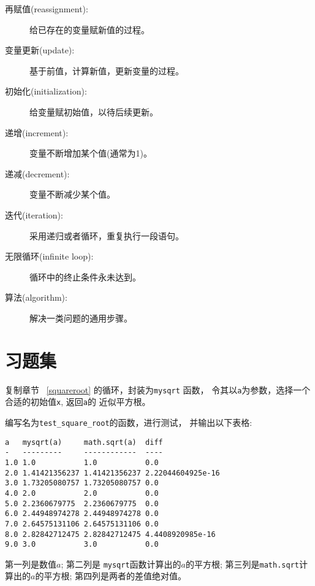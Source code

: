 \documentclass[10pt]{book}
\begin{document}
\begin{description}

\item[再赋值(reassignment):] 给已存在的变量赋新值的过程。

\item[变量更新(update):] 基于前值，计算新值，更新变量的过程。

\item[初始化(initialization):] 给变量赋初始值，以待后续更新。

\item[递增(increment):] 变量不断增加某个值(通常为1)。

\item[递减(decrement):] 变量不断减少某个值。

\item[迭代(iteration):] 采用递归或者循环，重复执行一段语句。

\item[无限循环(infinite loop):] 循环中的终止条件永未达到。

\item[算法(algorithm):]  解决一类问题的通用步骤。

\end{description}


\section{习题集}

\begin{exercise}

复制章节 ~\ref{squareroot} 的循环，封装为\verb"mysqrt" 函数，
令其以{\tt a}为参数，选择一个合适的初始值{\tt x}, 返回{\tt a}的
近似平方根。 

编写名为\verb"test_square_root"的函数，进行测试，
并输出以下表格:

\begin{verbatim}
a   mysqrt(a)     math.sqrt(a)  diff
-   ---------     ------------  ----
1.0 1.0           1.0           0.0
2.0 1.41421356237 1.41421356237 2.22044604925e-16
3.0 1.73205080757 1.73205080757 0.0
4.0 2.0           2.0           0.0
5.0 2.2360679775  2.2360679775  0.0
6.0 2.44948974278 2.44948974278 0.0
7.0 2.64575131106 2.64575131106 0.0
8.0 2.82842712475 2.82842712475 4.4408920985e-16
9.0 3.0           3.0           0.0
\end{verbatim}
%
第一列是数值$a$; 第二列是 \verb"mysqrt"函数计算出的$a$的平方根;
第三列是{\tt math.sqrt}计算出的$a$的平方根;
第四列是两者的差值绝对值。
\end{exercise}
\end{document}
